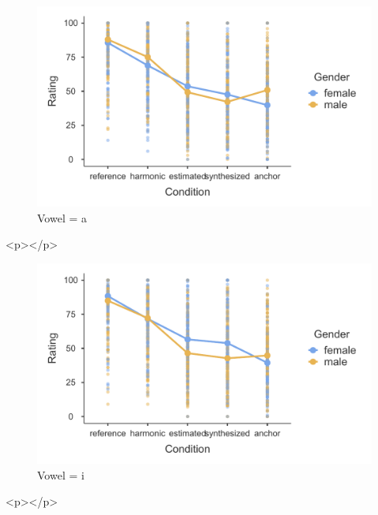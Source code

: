 \documentclass[a4paper,man,hidelinks,floatsintext]{apa7}
\begin{document}
    \begin{figure}[htbp]\caption{Vowel = a}
\label{fig:Figure_1}
\centering
\includegraphics[width=\columnwidth]{figure_1.pdf}
\end{figure}
      
        <p></p>
      
    \begin{figure}[htbp]\caption{Vowel = i}
\label{fig:Figure_2}
\centering
\includegraphics[width=\columnwidth]{figure_2.pdf}
\end{figure}
      
        <p></p>
      
\end{document}
